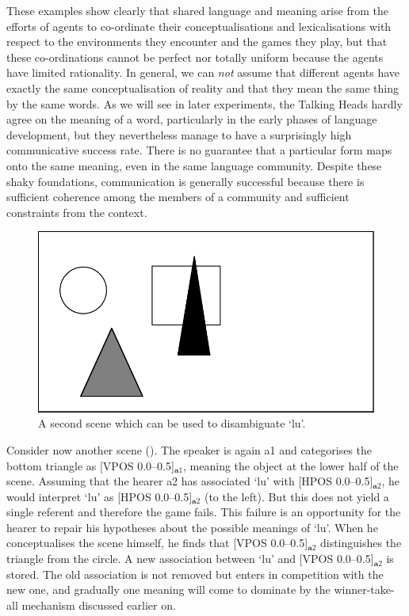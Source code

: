 These examples show clearly that shared language and meaning 
arise from the efforts of agents to co-ordinate their
conceptualisations and lexicalisations with respect 
to the environments they encounter and the games they play, 
but that these co-ordinations cannot be perfect nor totally 
uniform because the agents have limited rationality. 
In general, we can {\itshape not} assume that different agents
have exactly the same 
conceptualisation of reality and that they mean the same thing by 
the same words. As we will see in later experiments, the
Talking Heads hardly agree on the meaning of a word, particularly 
in the early phases of language development, but they 
nevertheless manage to have a surprisingly high communicative success
rate. There is no guarantee that a particular 
form maps onto the same meaning, even in the same language community.
Despite these shaky foundations, communication is generally 
successful because there is sufficient coherence among the members of 
a community and sufficient constraints from the context. 


\begin{figure}[htbp]
  \centerline{\includegraphics[width=.50\textwidth]{chap2/figs/scene1-2}}
\caption{\label{scene1-2} A second scene which 
can be used to disambiguate `lu'.}
\end{figure}
Consider now another scene (). The speaker
is again {\bfshape a1} and categorises the bottom triangle as 
[VPOS 0.0--0.5]$_{\mathbf  a1}$, meaning
the object at the lower half of the scene. Assuming that the
hearer {\bfshape a2} has associated `lu' with [HPOS 0.0--0.5]$_{\mathbf  a2}$, he
would interpret `lu' as [HPOS 0.0--0.5]$_{\mathbf  a2}$ (to the left). But this 
does not yield a single 
referent and therefore the game fails. 
This failure is an opportunity for the hearer to repair his 
hypotheses about the possible meanings of `lu'.
When he conceptualises the scene himself, 
he finds that [VPOS 0.0--0.5]$_{\mathbf  a2}$ distinguishes the triangle
from the circle. A new association between 
`lu' and [VPOS 0.0--0.5]$_{\mathbf  a2}$ is stored. The old association
is not removed but enters in competition with the new
one, and gradually one meaning will come to dominate
by the winner-take-all mechanism discussed earlier on. 

